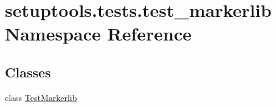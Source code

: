 \hypertarget{namespacesetuptools_1_1tests_1_1test__markerlib}{}\section{setuptools.\+tests.\+test\+\_\+markerlib Namespace Reference}
\label{namespacesetuptools_1_1tests_1_1test__markerlib}
\subsection*{Classes}
\begin{DoxyCompactItemize}
\item 
class \hyperlink{classsetuptools_1_1tests_1_1test__markerlib_1_1TestMarkerlib}{Test\+Markerlib}
\end{DoxyCompactItemize}

